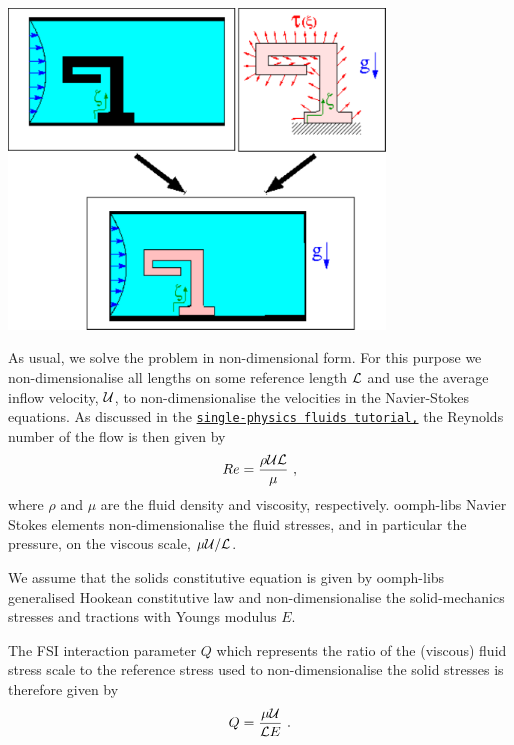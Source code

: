  
\begin{DoxyImage}
\includegraphics[width=0.75\textwidth]{fsi_sketch}
\end{DoxyImage}


As usual, we solve the problem in non-\/dimensional form. For this purpose we non-\/dimensionalise all lengths on some reference length $ {\cal L} $ and use the average inflow velocity, $ {\cal U}$, to non-\/dimensionalise the velocities in the Navier-\/\+Stokes equations. As discussed in the \href{../../../navier_stokes/unstructured_fluid/html/index.html#reynolds}{\tt single-\/physics fluids tutorial,} the Reynolds number of the flow is then given by \[ Re = \frac{\rho {\cal U} {\cal L}}{\mu} \ , \] where $ \rho $ and $ \mu $ are the fluid density and viscosity, respectively. {\ttfamily oomph-\/lib\textquotesingle{}s} Navier Stokes elements non-\/dimensionalise the fluid stresses, and in particular the pressure, on the viscous scale, $ \mu {\cal U}/{\cal L} $.

We assume that the solid\textquotesingle{}s constitutive equation is given by {\ttfamily oomph-\/lib\textquotesingle{}s} generalised Hookean constitutive law and non-\/dimensionalise the solid-\/mechanics stresses and tractions with Young\textquotesingle{}s modulus $ E $.

The F\+SI interaction parameter $ Q $ which represents the ratio of the (viscous) fluid stress scale to the reference stress used to non-\/dimensionalise the solid stresses is therefore given by \[ Q = \frac{\mu {\cal U}}{{\cal L} E} \ . \]



 

